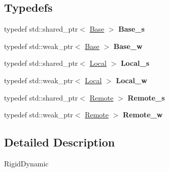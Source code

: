 \subsection*{\-Typedefs}
\begin{DoxyCompactItemize}
\item 
\hypertarget{namespaceNeb_1_1Actor_1_1RigidDynamic_aa26d62d2ac7049a08cf2741193a0927f}{typedef std\-::shared\-\_\-ptr$<$ \hyperlink{classNeb_1_1Actor_1_1RigidDynamic_1_1Base}{\-Base} $>$ {\bfseries \-Base\-\_\-s}}\label{namespaceNeb_1_1Actor_1_1RigidDynamic_aa26d62d2ac7049a08cf2741193a0927f}

\item 
\hypertarget{namespaceNeb_1_1Actor_1_1RigidDynamic_a70dc080ac3b5a0ca3d4165de6e9e2a11}{typedef std\-::weak\-\_\-ptr$<$ \hyperlink{classNeb_1_1Actor_1_1RigidDynamic_1_1Base}{\-Base} $>$ {\bfseries \-Base\-\_\-w}}\label{namespaceNeb_1_1Actor_1_1RigidDynamic_a70dc080ac3b5a0ca3d4165de6e9e2a11}

\item 
\hypertarget{namespaceNeb_1_1Actor_1_1RigidDynamic_a464255c3b068c2764dccba5d27fedf74}{typedef std\-::shared\-\_\-ptr$<$ \hyperlink{classNeb_1_1Actor_1_1RigidDynamic_1_1Local}{\-Local} $>$ {\bfseries \-Local\-\_\-s}}\label{namespaceNeb_1_1Actor_1_1RigidDynamic_a464255c3b068c2764dccba5d27fedf74}

\item 
\hypertarget{namespaceNeb_1_1Actor_1_1RigidDynamic_a714615f396ebf2d61ab3238dade33768}{typedef std\-::weak\-\_\-ptr$<$ \hyperlink{classNeb_1_1Actor_1_1RigidDynamic_1_1Local}{\-Local} $>$ {\bfseries \-Local\-\_\-w}}\label{namespaceNeb_1_1Actor_1_1RigidDynamic_a714615f396ebf2d61ab3238dade33768}

\item 
\hypertarget{namespaceNeb_1_1Actor_1_1RigidDynamic_ae5850fd3d5cc09756d84c606168818f9}{typedef std\-::shared\-\_\-ptr$<$ \hyperlink{classNeb_1_1Actor_1_1RigidDynamic_1_1Remote}{\-Remote} $>$ {\bfseries \-Remote\-\_\-s}}\label{namespaceNeb_1_1Actor_1_1RigidDynamic_ae5850fd3d5cc09756d84c606168818f9}

\item 
\hypertarget{namespaceNeb_1_1Actor_1_1RigidDynamic_a0ff5c19208e1b9168192c2f8febbfbca}{typedef std\-::weak\-\_\-ptr$<$ \hyperlink{classNeb_1_1Actor_1_1RigidDynamic_1_1Remote}{\-Remote} $>$ {\bfseries \-Remote\-\_\-w}}\label{namespaceNeb_1_1Actor_1_1RigidDynamic_a0ff5c19208e1b9168192c2f8febbfbca}

\end{DoxyCompactItemize}


\subsection{\-Detailed \-Description}
\-Rigid\-Dynamic 
